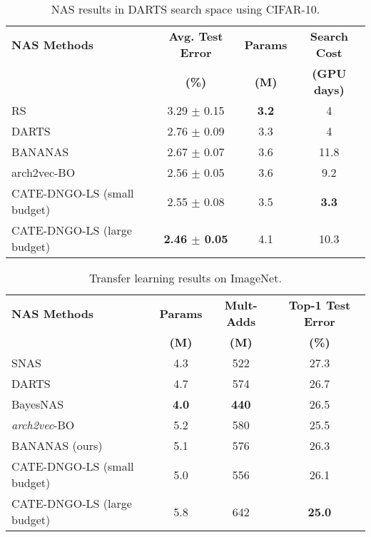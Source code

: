 \begin{table}[t]
\centering
\begin{adjustbox}{width=1.0\columnwidth}
{\small
\begin{tabular}{@{}l|c|c|c@{}}
\toprule
\multicolumn{1}{l}{\textbf{NAS Methods}} & \multicolumn{1}{c}{\textbf{Avg. Test Error}} & \multicolumn{1}{c}{\textbf{Params}} & \multicolumn{1}{c}{\textbf{Search Cost}}\\
\multicolumn{1}{l}{\textbf{}} & \multicolumn{1}{c}{\textbf{(\%)}} & \multicolumn{1}{c}{\textbf{(M)}} & \multicolumn{1}{c}{\textbf{(GPU days)}}\\
\midrule 
RS \cite{Li2019RandomSA}  & 3.29 $\pm$ 0.15 & \textbf{3.2} & 4  \\ 
DARTS \cite{liu2018darts}  & 2.76 $\pm$ 0.09 & 3.3 & 4  \\ 
BANANAS \cite{white2019bananas}  & 2.67 $\pm$ 0.07 & 3.6 & 11.8 \\ 
arch2vec-BO \cite{yan2020arch} & 2.56 $\pm$ 0.05 & 3.6 & 9.2 \\
\midrule
CATE-DNGO-LS (small budget) & 2.55 $\pm$ 0.08 & 3.5 &  \textbf{3.3} \\
CATE-DNGO-LS (large budget) & \textbf{2.46 $\pm$ 0.05} & 4.1 &  10.3 \\ 
\bottomrule
\end{tabular}
}
\end{adjustbox}
\caption{NAS results in DARTS search space using CIFAR-10.}
\label{table:cifar10-comparison}
\end{table}


\begin{table}[t]
\centering
\begin{adjustbox}{width=1.0\columnwidth}
{\small
\begin{tabular}{@{}l|c|c|c@{}}
\toprule
\multicolumn{1}{l}{\textbf{NAS Methods}} & \multicolumn{1}{c}{\textbf{Params}} & \multicolumn{1}{c}{\textbf{Mult-Adds}} & \multicolumn{1}{c}{\textbf{Top-1 Test Error}}\\
\multicolumn{1}{l}{\textbf{}} & 
\multicolumn{1}{c}{\textbf{(M)}} & \multicolumn{1}{c}{\textbf{(M)}} & \multicolumn{1}{c}{\textbf{(\%)}}\\
\midrule 
SNAS \cite{Xie2018SNAS}  & 4.3 & 522 & 27.3  \\ 
DARTS \cite{liu2018darts} & 4.7 & 574 & 26.7 \\
BayesNAS \cite{pmlr-v97-zhou19e} & \textbf{4.0} & \textbf{440} & 26.5 \\
\textit{arch2vec}-BO \cite{yan2020arch} & 5.2 & 580 & 25.5  \\ 
BANANAS (ours) & 5.1 & 576 & 26.3  \\
\midrule
CATE-DNGO-LS (small budget) & 5.0 & 556 & 26.1 \\  
CATE-DNGO-LS (large budget) & 5.8 & 642 & \textbf{25.0} \\  
\bottomrule
\end{tabular}
}
\end{adjustbox}
\caption{Transfer learning results on ImageNet.}
\label{table:imagenet-comparison}
\end{table}








